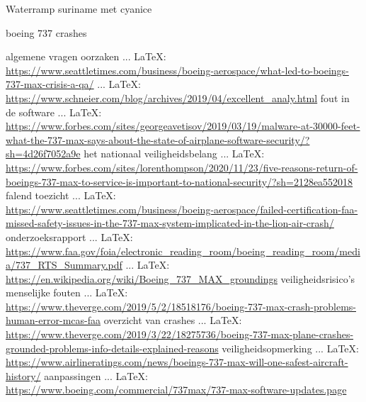 \begin{thebibliography}{99}
Waterramp suriname met cyanice


boeing 737 crashes


algemene vragen
oorzaken
 ... \LaTeX:\\ \url{https://www.seattletimes.com/business/boeing-aerospace/what-led-to-boeings-737-max-crisis-a-qa/}
 ... \LaTeX:\\ \url{https://www.schneier.com/blog/archives/2019/04/excellent_analy.html}
fout in de software
 ... \LaTeX:\\ \url{https://www.forbes.com/sites/georgeavetisov/2019/03/19/malware-at-30000-feet-what-the-737-max-says-about-the-state-of-airplane-software-security/?sh=4d26f7052a9e}
het nationaal veiligheidsbelang
 ... \LaTeX:\\ \url{https://www.forbes.com/sites/lorenthompson/2020/11/23/five-reasons-return-of-boeings-737-max-to-service-is-important-to-national-security/?sh=2128ea552018}
falend toezicht
 ... \LaTeX:\\ \url{https://www.seattletimes.com/business/boeing-aerospace/failed-certification-faa-missed-safety-issues-in-the-737-max-system-implicated-in-the-lion-air-crash/}
onderzoeksrapport
 ... \LaTeX:\\ \url{https://www.faa.gov/foia/electronic_reading_room/boeing_reading_room/media/737_RTS_Summary.pdf}
 ... \LaTeX:\\ \url{https://en.wikipedia.org/wiki/Boeing_737_MAX_groundings}
veiligheidsrisico's
menselijke fouten
 ... \LaTeX:\\ \url{https://www.theverge.com/2019/5/2/18518176/boeing-737-max-crash-problems-human-error-mcas-faa}
overzicht van crashes
 ... \LaTeX:\\ \url{https://www.theverge.com/2019/3/22/18275736/boeing-737-max-plane-crashes-grounded-problems-info-details-explained-reasons}
veiligheidsopmerking
 ... \LaTeX:\\ \url{https://www.airlineratings.com/news/boeings-737-max-will-one-safest-aircraft-history/}
aanpassingen
 ... \LaTeX:\\ \url{https://www.boeing.com/commercial/737max/737-max-software-updates.page}

\end{thebibliography}
